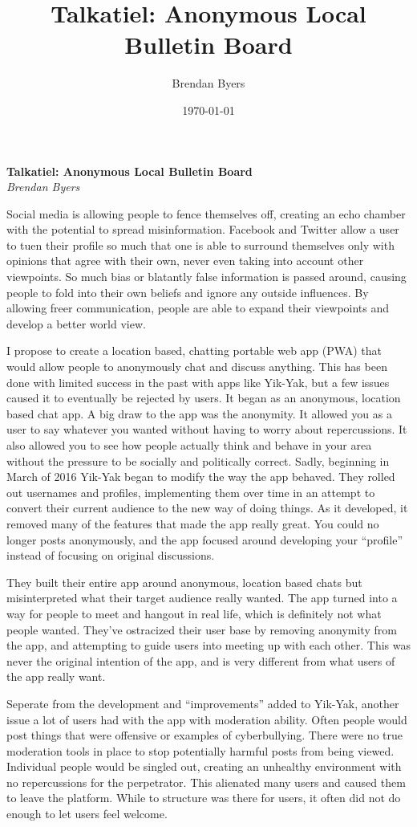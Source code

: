 \documentclass[12pt]{article}
\title{Talkatiel: Anonymous Local Bulletin Board}
\author{Brendan Byers}
\date{\today}
\begin{document}
\begin{center}
      \Large\textbf{Talkatiel: Anonymous Local Bulletin Board}\\
      \large\textit{Brendan Byers}
   \end{center}

Social media is allowing people to fence themselves off, creating an echo chamber with the potential to spread misinformation.  Facebook and Twitter allow a user to tuen their profile so much that one is able to surround themselves only with opinions that agree with their own, never even taking into account other viewpoints.  So much bias or blatantly false information is passed around, causing people to fold into their own beliefs and ignore any outside influences.  By allowing freer communication, people are able to expand their viewpoints and develop a better world view.

I propose to create a location based, chatting portable web app (PWA) that would allow people to anonymously chat and discuss anything.  This has been done with limited success in the past with apps like Yik-Yak, but a few issues caused it to eventually be rejected by users.  It began as an anonymous, location based chat app.  A big draw to the app was the anonymity.  It allowed you as a user to say whatever you wanted without having to worry about repercussions.  It also allowed you to see how people actually think and behave in your area without the pressure to be socially and politically correct.  Sadly, beginning in March of 2016 Yik-Yak began to modify the way the app behaved.  They rolled out usernames and profiles, implementing them over time in an attempt to convert their current audience to the new way of doing things.  As it developed, it removed many of the features that made the app really great.  You could no longer posts anonymously, and the app focused around developing your “profile” instead of focusing on original discussions.  

They built their entire app around anonymous, location based chats but misinterpreted what their target audience really wanted.  The app turned into a way for people to meet and hangout in real life, which is definitely not what people wanted.  They’ve ostracized their user base by removing anonymity from the app, and attempting to guide users into meeting up with each other.  This was never the original intention of the app, and is very different from what users of the app really want.  

Seperate from the development and “improvements” added to Yik-Yak, another issue a lot of users had with the app with moderation ability.  Often people would post things that were offensive or examples of cyberbullying.  There were no true moderation tools in place to stop potentially harmful posts from being viewed.  Individual people would be singled out, creating an unhealthy environment with no repercussions for the perpetrator.  This alienated many users and caused them to leave the platform.  While to structure was there for users, it often did not do enough to let users feel welcome.
\end{document}
